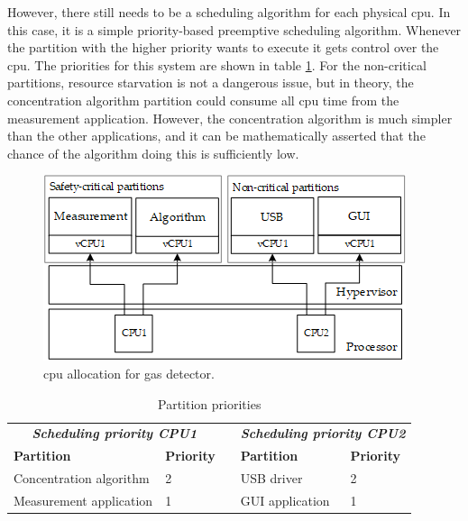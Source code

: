 However, there still needs to be a scheduling algorithm for each physical \acrshort{cpu}. In this case, it is a simple priority-based preemptive scheduling algorithm. Whenever the partition with the higher priority wants to execute it gets control over the \acrshort{cpu}. The priorities for this system are shown in table \ref{tab:gasdetect_priorities}. For the non-critical partitions, resource starvation is not a dangerous issue, but in theory, the concentration algorithm partition could consume all \acrshort{cpu} time from the measurement application. However, the concentration algorithm is much simpler than the other applications, and it can be mathematically asserted that the chance of the algorithm doing this is sufficiently low.

\begin{figure}[ht!]
\centering
\includegraphics[scale=0.8]{Figures/gas_detect_vcpu_schedule.png}
\decoRule
\caption{\acrshort{cpu} allocation for gas detector.}
\label{fig:gas_detect_vcpu_schedule}
\end{figure}

\begin{table}[hb!]
\centering
\begin{tabular}{lllll}
\multicolumn{2}{c}{\textit{\textbf{Scheduling priority CPU1}}}                         &                       & \multicolumn{2}{c}{\textit{\textbf{Scheduling priority CPU2}}}                   \\ \cline{1-2} \cline{4-5} 
\multicolumn{1}{|l|}{\textbf{Partition}}      & \multicolumn{1}{l|}{\textbf{Priority}} & \multicolumn{1}{l|}{} & \multicolumn{1}{l|}{\textbf{Partition}} & \multicolumn{1}{l|}{\textbf{Priority}} \\ \cline{1-2} \cline{4-5} 
\multicolumn{1}{|l|}{Concentration algorithm} & \multicolumn{1}{l|}{2}                 & \multicolumn{1}{l|}{} & \multicolumn{1}{l|}{USB driver}         & \multicolumn{1}{l|}{2}                 \\ \cline{1-2} \cline{4-5} 
\multicolumn{1}{|l|}{Measurement application} & \multicolumn{1}{l|}{1}                 & \multicolumn{1}{l|}{} & \multicolumn{1}{l|}{GUI application}    & \multicolumn{1}{l|}{1}                 \\ \cline{1-2} \cline{4-5} 
\end{tabular}
\caption{Partition priorities}
\label{tab:gasdetect_priorities}
\end{table}

